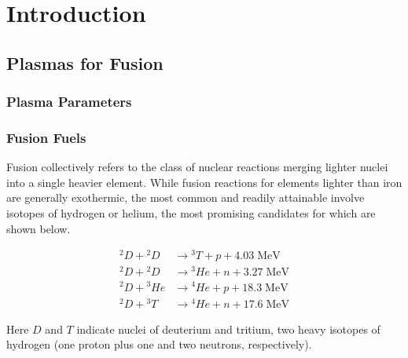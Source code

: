 \chapter{Introduction}\label{ch:Introduction}


\section{Plasmas for Fusion}\label{sec:intro_plasmas}

\subsection{Plasma Parameters}\label{subsec:intro_params}

\subsection{Fusion Fuels}\label{subsec:intro_fuels}


Fusion collectively refers to the class of nuclear reactions merging lighter nuclei into a single heavier element.  While fusion reactions for elements lighter than iron are generally exothermic, the most common and readily attainable involve isotopes of hydrogen or helium, the most promising candidates for which are shown below.

\begin{align}
 {}^2\si{D} + {}^2\si{D} &\rightarrow {}^3\si{T} + \si{p} + 4.03 \;\si{\mega\electronvolt}\label{eq:dd1}\\
 {}^2\si{D} + {}^2\si{D} &\rightarrow {}^{3}\si{He} + \si{n} + 3.27 \;\si{\mega\electronvolt}\label{eq:dd2}\\
 {}^2\si{D} + {}^3\si{He} &\rightarrow {}^4\si{He} + \si{p} + 18.3 \;\si{\mega\electronvolt}\label{eq:dhe3}\\
  {}^2\si{D} + {}^3\si{T} &\rightarrow {}^4\si{He} + \si{n} + 17.6 \;\si{\mega\electronvolt}\label{eq:dt}
\end{align}

\noindent Here $\si{D}$ and $\si{T}$ indicate nuclei of deuterium and tritium, two heavy isotopes of hydrogen (one proton plus one and two neutrons, respectively).

\begin{figure}
 \pushtooutside
\end{figure}


